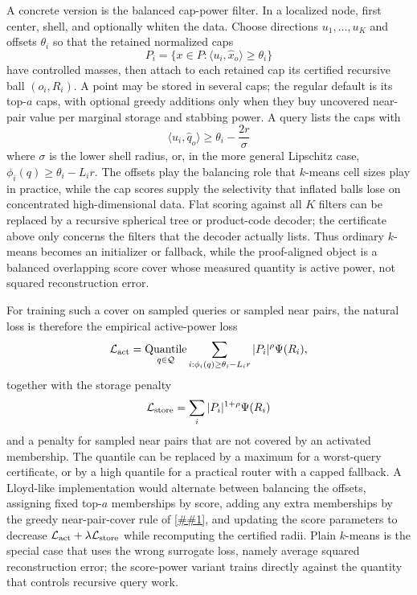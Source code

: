 \documentclass[10pt]{article}
\newcommand{\cref}[1]{\ref{##1}}
\theoremstyle{definition}
\begin{document}
A concrete version is the balanced cap-power filter.  In a localized node,
first center, shell, and optionally whiten the data.  Choose directions
$u_1,\ldots,u_K$ and offsets $\theta_i$ so that the retained normalized caps
\[
   P_i=\{x\in P:\langle u_i,\widehat x_o\rangle\ge\theta_i\}
\]
have controlled masses, then attach to each retained cap its certified
recursive ball $(o_i,R_i)$.  A point may be stored in several caps; the
regular default is its top-$a$ caps, with optional greedy additions only when
they buy uncovered near-pair value per marginal storage and stabbing power.
A query lists the caps with
\[
   \langle u_i,\widehat q_o\rangle\ge\theta_i-\frac{2r}{\sigma}
\]
where $\sigma$ is the lower shell radius, or, in the more general Lipschitz case,
$\phi_i(q)\ge\theta_i-L_i r$.  The offsets play the balancing role that
$k$-means cell sizes play in practice, while the cap scores supply the
selectivity that inflated balls lose on concentrated high-dimensional data.
Flat scoring against all $K$ filters can be replaced by a recursive spherical
tree or product-code decoder; the certificate above only concerns the filters
that the decoder actually lists.  Thus ordinary $k$-means becomes an
initializer or fallback, while the proof-aligned object is a balanced
overlapping score cover whose measured quantity is active power, not squared
reconstruction error.

For training such a cover on sampled queries or sampled near pairs, the natural
loss is therefore the empirical active-power loss
\[
   \mathcal L_{\rm act}
   =
   \operatorname*{Quantile}_{q\in\mathcal Q}
   \sum_{i:\phi_i(q)\ge \theta_i-L_i r}
   |P_i|^\rho\Psi(R_i),
\]
together with the storage penalty
\[
   \mathcal L_{\rm store}
   =
   \sum_i |P_i|^{1+\rho}\Psi(R_i)
\]
and a penalty for sampled near pairs that are not covered by an activated
membership.  The quantile can be replaced by a maximum for a worst-query
certificate, or by a high quantile for a practical router with a capped
fallback.  A Lloyd-like implementation would alternate between balancing the
offsets, assigning fixed top-$a$ memberships by score, adding any extra
memberships by the greedy near-pair-cover rule of
\cref{lem:cost-sensitive-near-pair-cover}, and updating the score parameters to
decrease $\mathcal L_{\rm act}+\lambda\mathcal L_{\rm store}$ while recomputing
the certified radii.  Plain $k$-means is the special case that uses the wrong
surrogate loss, namely average squared reconstruction error; the score-power
variant trains directly against the quantity that controls recursive query
work.
\end{document}

